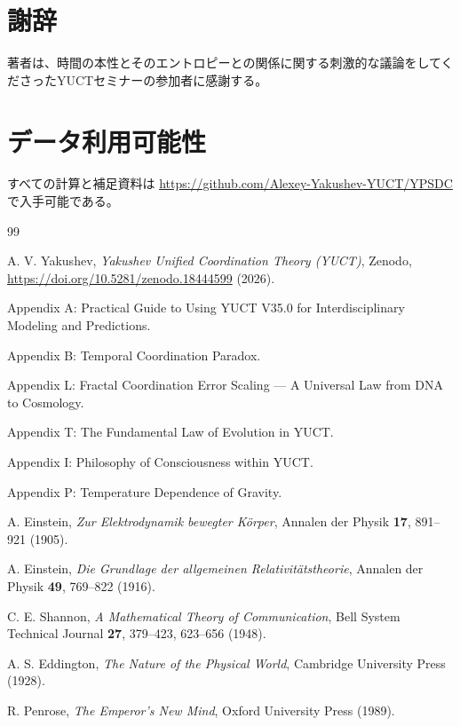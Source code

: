\documentclass[12pt,a4paper]{article}
\begin{document}
	\section*{謝辞}
	
	著者は、時間の本性とそのエントロピーとの関係に関する刺激的な議論をしてくださったYUCTセミナーの参加者に感謝する。
	
	\section*{データ利用可能性}
	
	すべての計算と補足資料は \url{https://github.com/Alexey-Yakushev-YUCT/YPSDC} で入手可能である。
	
	\begin{thebibliography}{99}
		
		A. V. Yakushev, \emph{Yakushev Unified Coordination Theory (YUCT)}, Zenodo, \url{https://doi.org/10.5281/zenodo.18444599} (2026).
		
		Appendix A: Practical Guide to Using YUCT V35.0 for Interdisciplinary Modeling and Predictions.
		
		Appendix B: Temporal Coordination Paradox.
		
		Appendix L: Fractal Coordination Error Scaling — A Universal Law from DNA to Cosmology.
		
		Appendix T: The Fundamental Law of Evolution in YUCT.
		
		Appendix I: Philosophy of Consciousness within YUCT.
		
		Appendix P: Temperature Dependence of Gravity.
		
		A. Einstein, \emph{Zur Elektrodynamik bewegter Körper}, Annalen der Physik \textbf{17}, 891–921 (1905).
		
		A. Einstein, \emph{Die Grundlage der allgemeinen Relativitätstheorie}, Annalen der Physik \textbf{49}, 769–822 (1916).
		
		C. E. Shannon, \emph{A Mathematical Theory of Communication}, Bell System Technical Journal \textbf{27}, 379–423, 623–656 (1948).
		
		A. S. Eddington, \emph{The Nature of the Physical World}, Cambridge University Press (1928).
		
		R. Penrose, \emph{The Emperor's New Mind}, Oxford University Press (1989).
		

\end{thebibliography}
\end{document}

